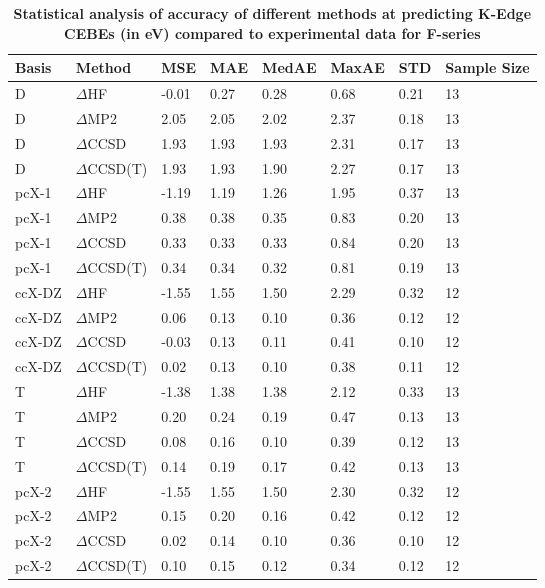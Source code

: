 \begin{table}
  \caption{\textbf{Statistical analysis of accuracy of different methods at predicting K-Edge CEBEs (in eV) compared to experimental data for F-series}}
  \label{tbl:method-summary-f}
  \begin{tabular}{l l l l l l l l }
    \toprule
    \textbf{Basis} & \textbf{Method} & \textbf{MSE} & \textbf{MAE} & \textbf{MedAE} & \textbf{MaxAE} & \textbf{STD} & \textbf{Sample Size} \\ 
    \midrule
    D & $\Delta$HF & -0.01 & 0.27 & 0.28 & 0.68 & 0.21 & 13 \\ 
    D & $\Delta$MP2 & 2.05 & 2.05 & 2.02 & 2.37 & 0.18 & 13 \\ 
    D & $\Delta$CCSD & 1.93 & 1.93 & 1.93 & 2.31 & 0.17 & 13 \\ 
    D & $\Delta$CCSD(T) & 1.93 & 1.93 & 1.90 & 2.27 & 0.17 & 13 \\ 
    pcX-1 & $\Delta$HF & -1.19 & 1.19 & 1.26 & 1.95 & 0.37 & 13 \\ 
    pcX-1 & $\Delta$MP2 & 0.38 & 0.38 & 0.35 & 0.83 & 0.20 & 13 \\ 
    pcX-1 & $\Delta$CCSD & 0.33 & 0.33 & 0.33 & 0.84 & 0.20 & 13 \\ 
    pcX-1 & $\Delta$CCSD(T) & 0.34 & 0.34 & 0.32 & 0.81 & 0.19 & 13 \\ 
    ccX-DZ & $\Delta$HF & -1.55 & 1.55 & 1.50 & 2.29 & 0.32 & 12 \\ 
    ccX-DZ & $\Delta$MP2 & 0.06 & 0.13 & 0.10 & 0.36 & 0.12 & 12 \\ 
    ccX-DZ & $\Delta$CCSD & -0.03 & 0.13 & 0.11 & 0.41 & 0.10 & 12 \\ 
    ccX-DZ & $\Delta$CCSD(T) & 0.02 & 0.13 & 0.10 & 0.38 & 0.11 & 12 \\ 
    T & $\Delta$HF & -1.38 & 1.38 & 1.38 & 2.12 & 0.33 & 13 \\ 
    T & $\Delta$MP2 & 0.20 & 0.24 & 0.19 & 0.47 & 0.13 & 13 \\ 
    T & $\Delta$CCSD & 0.08 & 0.16 & 0.10 & 0.39 & 0.12 & 13 \\ 
    T & $\Delta$CCSD(T) & 0.14 & 0.19 & 0.17 & 0.42 & 0.13 & 13 \\ 
    pcX-2 & $\Delta$HF & -1.55 & 1.55 & 1.50 & 2.30 & 0.32 & 12 \\ 
    pcX-2 & $\Delta$MP2 & 0.15 & 0.20 & 0.16 & 0.42 & 0.12 & 12 \\ 
    pcX-2 & $\Delta$CCSD & 0.02 & 0.14 & 0.10 & 0.36 & 0.10 & 12 \\ 
    pcX-2 & $\Delta$CCSD(T) & 0.10 & 0.15 & 0.12 & 0.34 & 0.12 & 12 \\ 

\end{tabular}
\end{table}
